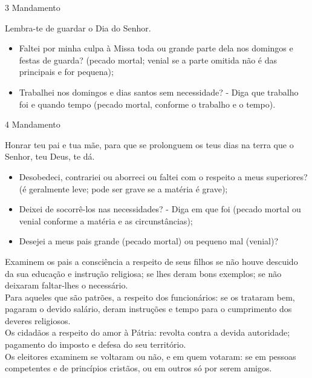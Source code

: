 \documentclass{book}
\begin{document}
\begin{center}
    3\textordmasculine{} Mandamento
\end{center}
\begin{flushleft}
    Lembra-te de guardar o Dia do Senhor.
\end{flushleft}
\begin{itemize}
    \item Faltei por minha culpa à Missa toda ou grande parte dela nos domingos e festas de guarda? (pecado mortal; venial se a parte omitida não é das principais e for pequena);
    \item Trabalhei nos domingos e dias santos sem necessidade? - Diga que trabalho foi e quando tempo (pecado mortal, conforme o trabalho e o tempo).
\end{itemize}
\newpage
\begin{center}
    4\textordmasculine{} Mandamento
\end{center}
\begin{flushleft}
    Honrar teu pai e tua mãe, para que se prolonguem os teus dias na terra que o Senhor, teu Deus, te dá.
\end{flushleft}
\begin{itemize}
    \item Desobedeci, contrariei ou aborreci ou faltei com o respeito a meus superiores? (é geralmente leve; pode ser grave se a matéria é grave);
    \item Deixei de socorrê-los nas necessidades? - Diga em que foi (pecado mortal ou venial conforme a matéria e as circunstâncias);
    \item Desejei a meus pais grande (pecado mortal) ou pequeno mal (venial)?
\end{itemize}
\begin{flushleft}
    Examinem os pais a consciência a respeito de seus filhos se não houve descuido da sua educação e instrução religiosa; se lhes deram bons exemplos; se não deixaram faltar-lhes o necessário. \\
    Para aqueles que são patrões, a respeito dos funcionários: se os trataram bem, pagaram o devido salário, deram instruções e tempo para o cumprimento dos deveres religiosos. \\
    Os cidadãos a respeito do amor à Pátria: revolta contra a devida autoridade; pagamento do imposto e defesa do seu território.  \\
    Os eleitores examinem se voltaram ou não, e em quem votaram: se em pessoas competentes e de princípios cristãos, ou em outros só por serem amigos.
\end{flushleft}
\end{document}

